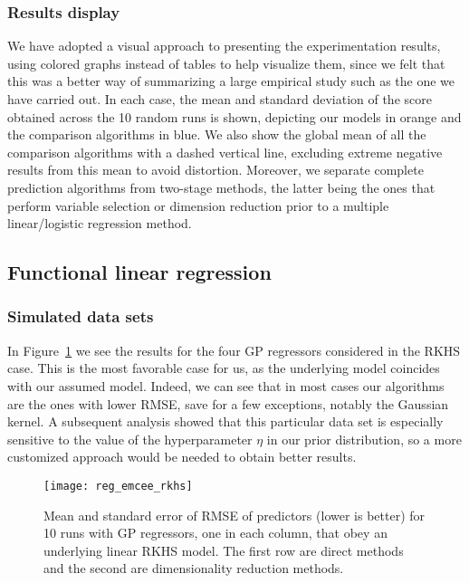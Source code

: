 \documentclass{article}
\numberwithin{equation}{section}
\theoremstyle{plain}
\begin{document}
\subsubsection*{Results display}

We have adopted a visual approach to presenting the experimentation results, using colored graphs instead of tables to help visualize them, since we felt that this was a better way of summarizing a large empirical study such as the one we have carried out. In each case, the mean and standard deviation of the score obtained across the 10 random runs is shown, depicting our models in orange and the comparison algorithms in blue. We also show the global mean of all the comparison algorithms with a dashed vertical line, excluding extreme negative results from this mean to avoid distortion. Moreover, we separate complete prediction algorithms from two-stage methods, the latter being the ones that perform variable selection or dimension reduction prior to a multiple linear/logistic regression method.

\subsection{Functional linear regression}\label{sec:experiments-linear}

\subsubsection*{Simulated data sets}

In Figure~\ref{fig:reg_emcee_rkhs} we see the results for the four GP regressors considered in the RKHS case. This is the most favorable case for us, as the underlying model coincides with our assumed model. Indeed, we can see that in most cases our algorithms are the ones with lower RMSE, save for a few exceptions, notably the Gaussian kernel. A subsequent analysis showed that this particular data set is especially sensitive to the value of the hyperparameter \(\eta\) in our prior distribution, so a more customized approach would be needed to obtain better results.


\begin{figure}[ht!]
  \centering
  \texttt{[image: reg\_emcee\_rkhs]}
  \caption{Mean and standard error of RMSE of predictors (lower is better) for 10 runs with GP regressors, one in each column, that obey an underlying linear RKHS model. The first row are direct methods and the second are dimensionality reduction methods.}\label{fig:reg_emcee_rkhs}
\end{figure}
\end{document}
